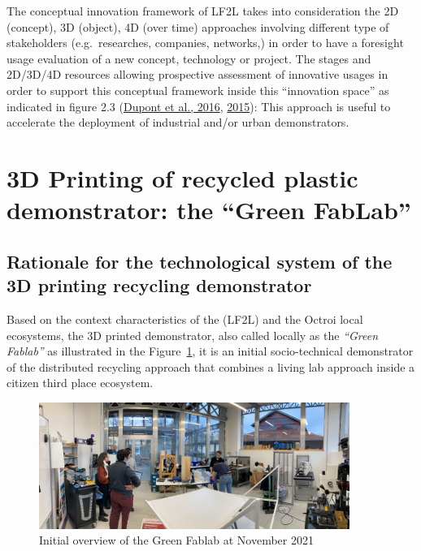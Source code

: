 \documentclass[
  11pt,
]{article}
\begin{document}
The conceptual innovation framework of LF2L takes into consideration the
2D (concept), 3D (object), 4D (over time) approaches involving different
type of stakeholders (e.g.~researches, companies, networks,) in order to
have a foresight usage evaluation of a new concept, technology or
project. The stages and 2D/3D/4D resources allowing prospective
assessment of innovative usages in order to support this conceptual
framework inside this ``innovation space'' as indicated in figure 2.3
(\protect\hyperlink{ref-Dupont2016}{Dupont et al., 2016},
\protect\hyperlink{ref-Dupont2015b}{2015}): This approach is useful to
accelerate the deployment of industrial and/or urban demonstrators.

\hypertarget{d-printing-of-recycled-plastic-demonstrator-the-green-fablab}{%
\section{3D Printing of recycled plastic demonstrator: the ``Green
FabLab''}\label{d-printing-of-recycled-plastic-demonstrator-the-green-fablab}}

\hypertarget{rationale-for-the-technological-system-of-the-3d-printing-recycling-demonstrator}{%
\subsection{Rationale for the technological system of the 3D printing
recycling
demonstrator}\label{rationale-for-the-technological-system-of-the-3d-printing-recycling-demonstrator}}

Based on the context characteristics of the (LF2L\textregistered) and
the Octroi local ecosystems, the 3D printed demonstrator, also called
locally as the \emph{``Green Fablab''} as illustrated in the
Figure~\ref{fig-gf-2021}, it is an initial socio-technical demonstrator
of the distributed recycling approach that combines a living lab
approach inside a citizen third place ecosystem.

\begin{figure}[H]

{\centering \includegraphics[width=0.9\textwidth,height=\textheight]{figures/2021-11-17-octroi.jpeg}

}

\caption{\label{fig-gf-2021}Initial overview of the Green Fablab at
November 2021}

\end{figure}
\end{document}
